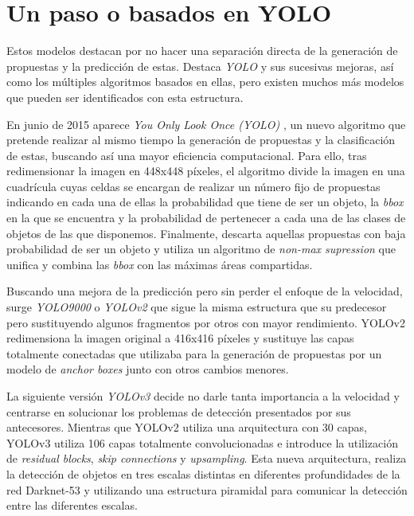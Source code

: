 \section{Un paso o basados en YOLO}
Estos modelos destacan por no hacer una separación directa de la generación de propuestas y la predicción de estas. Destaca \emph{YOLO} y sus sucesivas mejoras, así como los múltiples algoritmos basados en ellas, pero existen muchos más modelos que pueden ser identificados con esta estructura.\newline

En junio de 2015 aparece \emph{You Only Look Once (YOLO)} \cite{2015arXiv150602640R}, un nuevo algoritmo que pretende realizar al mismo tiempo la generación de propuestas y la clasificación de estas, buscando así una mayor eficiencia computacional. Para ello, tras redimensionar la imagen en 448x448 píxeles, el algoritmo divide la imagen en una cuadrícula cuyas celdas se encargan de realizar un número fijo de propuestas indicando en cada una de ellas la probabilidad que tiene de ser un objeto, la \emph{bbox} en la que se encuentra y la probabilidad de pertenecer a cada una de las clases de objetos de las que disponemos. Finalmente, descarta aquellas propuestas con baja probabilidad de ser un objeto y utiliza un algoritmo de \emph{non-max supression} \cite{2017arXiv170404503B} que unifica y combina las \emph{bbox} con las máximas áreas compartidas.\newline

Buscando una mejora de la predicción pero sin perder el enfoque de la velocidad, surge \emph{YOLO9000} o \emph{YOLOv2} \cite{2016arXiv161208242R} que sigue la misma estructura que su predecesor pero sustituyendo algunos fragmentos por otros con mayor rendimiento. YOLOv2 redimensiona la imagen original a 416x416 píxeles y sustituye las capas totalmente conectadas que utilizaba para la generación de propuestas por un modelo de \emph{anchor boxes} \cite{2015arXiv150601497R} junto con otros cambios menores.\newline

La siguiente versión \emph{YOLOv3} \cite{2018arXiv180402767R} decide  no darle tanta importancia a la velocidad y centrarse en solucionar los problemas de detección presentados por sus antecesores. Mientras que YOLOv2 utiliza una arquitectura con 30 capas, YOLOv3 utiliza 106 capas totalmente convolucionadas e introduce la utilización de \emph{residual blocks}, \emph{skip connections} y \emph{upsampling}. Esta nueva arquitectura, realiza la detección de objetos en tres escalas distintas en diferentes profundidades de la red Darknet-53 y utilizando una estructura piramidal \cite{2016arXiv161203144L} para comunicar la detección entre las diferentes escalas.\newline

